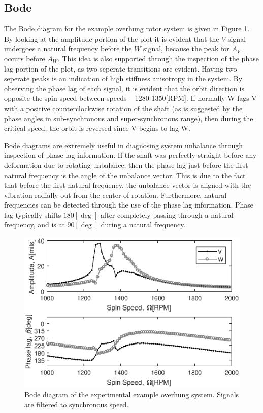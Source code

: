 \subsection{Bode}
The Bode diagram for the example overhung rotor system is given in Figure \ref{fig:ExpExampleBode}. By looking at the amplitude portion of the plot it is evident that the $ V $ signal undergoes a natural frequency before the $ W $ signal, because the peak for $ A_V $ occurs before $ A_W $. This idea is also supported through the inspection of the phase lag portion of the plot, as two seperate transitions are evident. Having two seperate peaks is an indication of high stiffness anisotropy in the system. By observing the phase lag of each signal, it is evident that the orbit direction is opposite the spin speed between speeds ~ 1280-1350[RPM]. If normally W lags V with a positive counterclockwise rotation of the shaft (as is suggested by the phase angles in sub-synchronous and super-synchronous range), then during the critical speed, the orbit is reversed since V begins to lag W.\par
Bode diagrams are extremely useful in diagnosing system unbalance through inspection of phase lag information. If the shaft was perfectly straight before any deformation due to rotating unbalance, then the phase lag just before the first natural frequency is the angle of the unbalance vector. This is due to the fact that before the first natural frequency, the unbalance vector is aligned with the vibration radially out from the center of rotation. Furthermore, natural frequencies can be detected through the use of the phase lag information. Phase lag typically shifts $ 180[\deg] $ after completely passing through a natural frequency, and is at $ 90[\deg] $ during a natural frequency.
\begin{figure}
	\centering
	\includegraphics[]{./figures/ExpExampleBode.eps}
	\caption{Bode diagram of the experimental example overhung system. Signals are filtered to synchronous speed.}
	\label{fig:ExpExampleBode}
\end{figure}
